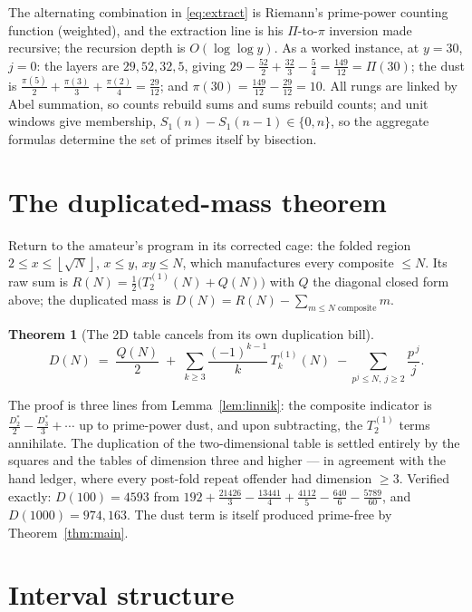 \documentclass[11pt]{article}
\newtheorem{theorem}{Theorem}
\theoremstyle{remark}
\newcommand{\fl}[1]{\left\lfloor #1 \right\rfloor}
\begin{document}
The alternating combination in \eqref{eq:extract} is Riemann's prime-power counting function (weighted),
and the extraction line is his $\Pi$-to-$\pi$ inversion made recursive; the recursion depth is
$O(\log \log y)$. As a worked instance, at $y = 30$, $j = 0$: the layers are $29, 52, 32, 5$, giving
$29 - \tfrac{52}{2} + \tfrac{32}{3} - \tfrac{5}{4} = \tfrac{149}{12} = \Pi(30)$; the dust is
$\tfrac{\pi(5)}{2} + \tfrac{\pi(3)}{3} + \tfrac{\pi(2)}{4} = \tfrac{29}{12}$; and
$\pi(30) = \tfrac{149}{12} - \tfrac{29}{12} = 10$. All rungs are linked by Abel summation, so counts
rebuild sums and sums rebuild counts; and unit windows give membership,
$S_1(n) - S_1(n-1) \in \{0, n\}$, so the aggregate formulas determine the set of primes itself by
bisection.

\section{The duplicated-mass theorem}

Return to the amateur's program in its corrected cage: the folded region $2 \le x \le \fl{\sqrt N}$,
$x \le y$, $xy \le N$, which manufactures every composite $\le N$. Its raw sum is
$R(N) = \tfrac12\big(T_2^{(1)}(N) + Q(N)\big)$ with $Q$ the diagonal closed form above; the duplicated
mass is $D(N) = R(N) - \sum_{m \le N \text{ composite}} m$.

\begin{theorem}[The 2D table cancels from its own duplication bill]\label{thm:dup}
\[
D(N) \;=\; \frac{Q(N)}{2} \;+\; \sum_{k \ge 3} \frac{(-1)^{k-1}}{k}\, T_k^{(1)}(N)
\;-\!\!\sum_{p^{j} \le N,\ j \ge 2} \frac{p^{\,j}}{j}.
\]
\end{theorem}

The proof is three lines from Lemma~\ref{lem:linnik}: the composite indicator is
$\tfrac{D_2^*}{2} - \tfrac{D_3^*}{3} + \cdots$ up to prime-power dust, and upon subtracting, the
$T_2^{(1)}$ terms annihilate. The duplication of the two-dimensional table is settled entirely by the
squares and the tables of dimension three and higher --- in agreement with the hand ledger, where every
post-fold repeat offender had dimension $\ge 3$. Verified exactly: $D(100) = 4593$ from
$192 + \tfrac{21426}{3} - \tfrac{13441}{4} + \tfrac{4112}{5} - \tfrac{640}{6} - \tfrac{5789}{60}$, and
$D(1000) = 974{,}163$. The dust term is itself produced prime-free by Theorem~\ref{thm:main}.

\section{Interval structure}
\end{document}
